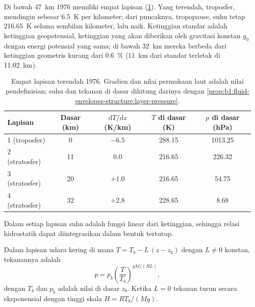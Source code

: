 Di bawah \qty{47}{km}  1976 memiliki empat lapisan (\cref{tab:b1:fluid-envelopes-structure:layers}). Yang terendah, troposfer, mendingin sebesar \qty{6.5}{K} per kilometer; dari puncaknya, tropopause, suhu tetap \qty{216.65}{K} selama sembilan kilometer, lalu naik. Ketinggian standar adalah ketinggian geopotensial, ketinggian yang akan diberikan oleh gravitasi konstan $g_0$ dengan energi potensial yang sama; di bawah \qty{32}{km} mereka berbeda dari ketinggian geometris kurang dari \qty{0.6}{\percent} (\qty{11}{km} dari standar terletak di \qty{11.02}{km}).

\begin{table}[ht]
\centering
\small
\renewcommand{\arraystretch}{1.2}
\begin{tabular}{|l|c|c|c|c|}
\hline
Lapisan & Dasar (km) & $\mathrm dT/\mathrm dz$ (K/km) & $T$ di dasar (K) & $p$ di dasar (hPa) \\
\hline
1 (troposfer) & 0 & $-6.5$ & 288.15 & 1013.25 \\
2 (stratosfer) & 11 & 0.0 & 216.65 & 226.32 \\
3 (stratosfer) & 20 & $+1.0$ & 216.65 & 54.75 \\
4 (stratosfer) & 32 & $+2.8$ & 228.65 & 8.68 \\
\hline
\end{tabular}
\caption{Empat lapisan terendah  1976. Gradien dan nilai permukaan laut adalah nilai pendefinisian; suhu dan tekanan di dasar dihitung darinya dengan \cref{prop:b1:fluid-envelopes-structure:layer-pressure}.}
\label{tab:b1:fluid-envelopes-structure:layers}
\end{table}

Dalam setiap lapisan suhu adalah fungsi linear dari ketinggian, sehingga relasi hidrostatik dapat diintegrasikan dalam bentuk tertutup.

\begin{proposition}\label{prop:b1:fluid-envelopes-structure:layer-pressure}
Dalam lapisan udara kering di mana $T = T_b - L\,(z - z_b)$ dengan $L \neq 0$ konstan, tekanannya adalah
\[
  p = p_b \left(\frac{T}{T_b}\right)^{gM/(RL)},
\]
dengan $T_b$ dan $p_b$ adalah nilai di dasar $z_b$. Ketika $L = 0$ tekanan turun secara eksponensial dengan tinggi skala $H = RT_b/(Mg)$.
\end{proposition}

